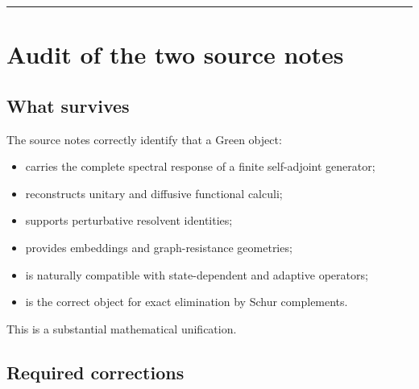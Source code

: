 \documentclass[11pt,a4paper,openany]{report}
\begin{document}
\par\medskip\hrule\medskip

\chapter{Audit of the two source notes}

\section{What survives}

The source notes correctly identify that a Green object:

\begin{itemize}
\item 
carries the complete spectral response of a finite self-adjoint generator;

\item 
reconstructs unitary and diffusive functional calculi;

\item 
supports perturbative resolvent identities;

\item 
provides embeddings and graph-resistance geometries;

\item 
is naturally compatible with state-dependent and adaptive operators;

\item 
is the correct object for exact elimination by Schur complements.

\end{itemize}

This is a substantial mathematical unification.

\section{Required corrections}
\end{document}
